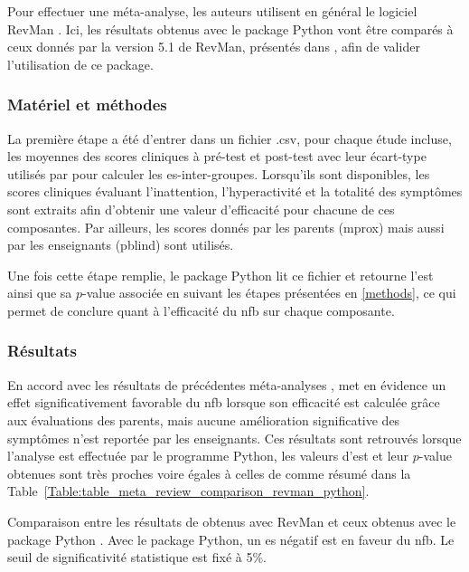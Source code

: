 Pour effectuer une méta-analyse, les auteurs utilisent en général le logiciel RevMan \citep{Revman, Cortese2016, Micoulaud2014}. Ici, les résultats 
obtenus avec le package Python vont être comparés à ceux donnés par la version 5.1 de RevMan, présentés dans \citet{Cortese2016}, 
afin de valider l'utilisation de ce package.

\subsubsection{Matériel et méthodes}
La première étape a été d'entrer dans un fichier .csv, pour chaque étude incluse, les moyennes des scores cliniques à pré-test et post-test avec leur écart-type 
utilisés par \citet{Cortese2016} pour calculer les \gls{es}-inter-groupes. Lorsqu'ils sont disponibles, les scores cliniques évaluant l'inattention, l'hyperactivité 
et la totalité des symptômes sont extraits afin d'obtenir une valeur d'efficacité pour chacune de ces composantes. Par ailleurs, les scores donnés par les
parents (\gls{mprox}) mais aussi par les enseignants (\gls{pblind}) sont utilisés.

Une fois cette étape remplie, le package Python lit ce fichier et retourne l'\gls{est} ainsi que sa $p$-value associée en suivant les étapes présentées en
\ref{methods}, ce qui permet de conclure quant à l'efficacité du \gls{nfb} sur chaque composante.

\subsubsection{Résultats}
En accord avec les résultats de précédentes méta-analyses \citep{Sonuga-Barke2013, Micoulaud2014}, \citet{Cortese2016}
met en évidence un effet significativement favorable du \gls{nfb} lorsque son efficacité est calculée grâce aux évaluations des parents, mais aucune amélioration 
significative des symptômes n'est reportée par les enseignants. Ces résultats sont retrouvés lorsque l'analyse est effectuée par le programme Python, les valeurs
d'\gls{est} et leur $p$-value obtenues sont très proches voire égales à celles de \citet{Cortese2016} comme résumé dans la 
Table~\ref{Table:table_meta_review_comparison_revman_python}. 

\begin{table}[h!]
  \centering
  \caption{Comparaison entre les résultats de \citet{Cortese2016} obtenus avec RevMan \citep{Revman} et ceux obtenus avec le package Python \citep{Bussalb2019clinical}.
	Avec le package Python, un \gls{es} négatif est en faveur du \gls{nfb}. Le seuil de significativité statistique est fixé à 5\%.}
  
  \label{Table:table_meta_review_comparison_revman_python}
\end{table}

